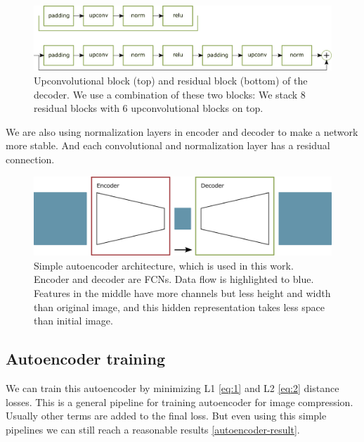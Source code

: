 \begin{figure}[!ht]
    \centering
    \includegraphics[width=\textwidth]{figure/generator.png}
    \caption{Upconvolutional block (top) and residual block (bottom) of the decoder. We use a combination of these two blocks: We stack 8 residual blocks with 6 upconvolutional blocks on top.}
    \label{decoder}
\end{figure}

We are also using normalization layers in encoder and decoder to make a network more stable. And each convolutional and normalization layer has a residual connection.

\begin{figure}[!ht]
    \centering
    \includegraphics[width=\textwidth]{figure/general-autoencoder.png}
    \caption{Simple autoencoder architecture, which is used in this work. Encoder and decoder are FCNs. Data flow is highlighted to blue. Features in the middle have more channels but less height and width than original image, and this hidden representation takes less space than initial image.}
    \label{autoencoder}
\end{figure}

\subsection{Autoencoder training}

We can train this autoencoder by minimizing L1 \ref{eq:1} and L2 \ref{eq:2} distance losses. This is a general pipeline for training autoencoder for image compression. Usually other terms are added to the final loss. But even using this simple pipelines we can still reach a reasonable results \ref{autoencoder-result}.

